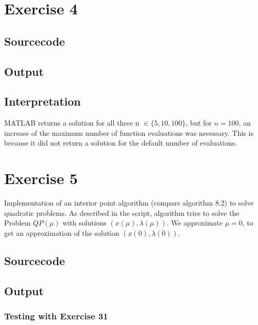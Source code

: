 \documentclass{article}
\begin{document}
    \section{Exercise 4}
	\subsection{Sourcecode}
	
	\subsection{Output}
	
	\subsection{Interpretation}
	MATLAB returns a solution for all three n $\in \{5,10,100\}$, but for $n = 100$, an increase of the maximum number of function evaluations was necessary. This is because it did not return a solution for the default number of evaluations.
	
\section{Exercise 5}
Implementation of an interior point algorithm (compare algorithm 8.2) to solve quadratic problems. As described in the script,  algorithm tries to solve the Problem $QP(\mu)$ with solutions $(x(\mu),\lambda(\mu))$. We approximate $\mu=0$, to get an approximation of the solution $(x(0),\lambda(0))$.
\subsection{Sourcecode}






\subsection{Output}

\subsubsection{Testing with Exercise 31}


\end{document}
